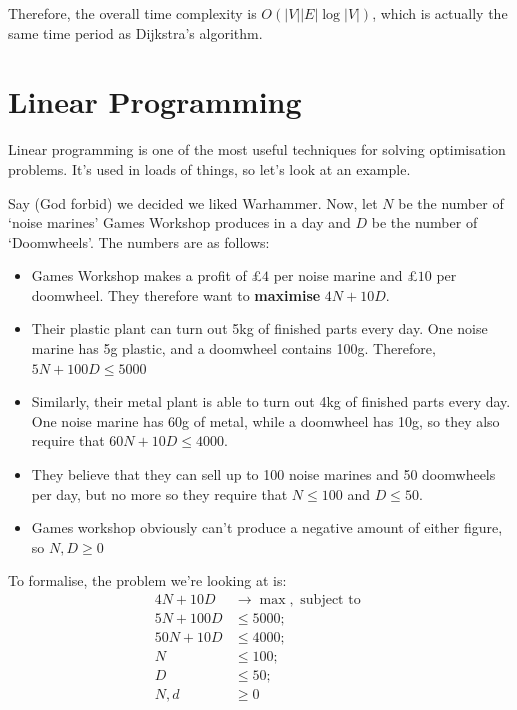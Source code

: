 \documentclass[11pt,a4paper,titlepage,dvipsnames,cmyk]{scrartcl}
\begin{document}
Therefore, the overall time complexity is $O(|V||E|\log|V|)$, which is
actually the same time period as Dijkstra's algorithm.

\section{Linear Programming}%
\label{sec:linear-programming}
Linear programming is one of the most useful techniques for solving
optimisation problems. It's used in loads of things, so let's look at an
example.

Say (God forbid) we decided we liked Warhammer. Now, let $N$ be the number
of `noise marines' Games Workshop produces in a day and $D$ be the number
of `Doomwheels'. The numbers are as follows:

\begin{itemize}
    \item Games Workshop makes a profit of £$4$ per noise marine and
        £$10$ per doomwheel. They therefore want to \textbf{maximise} $4N
        + 10D$. 
    \item Their plastic plant can turn out 5kg of finished parts every
        day. One noise marine has 5g plastic, and a doomwheel contains
        100g. Therefore, $5N + 100D \le 5000$
    \item Similarly, their metal plant is able to turn out 4kg of finished
        parts every day. One noise marine has 60g of metal, while a
        doomwheel has 10g, so they also require that $60N + 10D \le 4000$.
    \item They believe that they can sell up to 100 noise marines and 50
        doomwheels per day, but no more so they require that $N \le 100$
        and $D \le 50$.
    \item Games workshop obviously can't produce a negative amount of
        either figure, so $N, D \ge 0$
\end{itemize}

To formalise, the problem we're looking at is:
\begin{align*}
    4N + 10D &\rightarrow \max, \text{ subject to } \\
    5N + 100D &\le 5000;\\
    50N + 10D &\le 4000;\\
    N &\le 100;\\
    D &\le 50;\\
    N, d &\ge 0
\end{align*}
\end{document}
